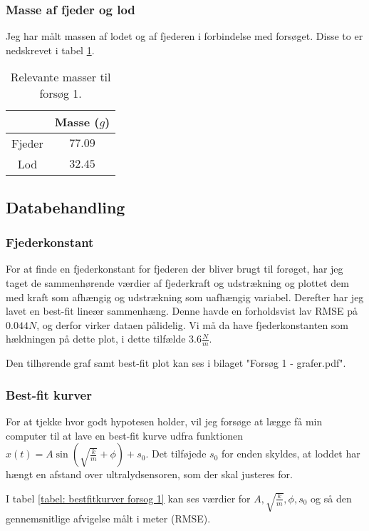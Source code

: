 \subsubsection{Masse af fjeder og lod}\label{exp1: Masse af fjeder og lod}
Jeg har målt massen af lodet og af fjederen i forbindelse med forsøget. 
Disse to er nedskrevet i tabel \ref{tabel: Masser forsog 1}.
\begin{table}[h]
\centering
\begin{tabular}{|c|c|}
\hline 
 & Masse ($g$) \\ 
\hline 
Fjeder & $77.09$ \\ 
\hline 
Lod & $32.45$ \\ 
\hline 
\end{tabular} 
\caption{Relevante masser til forsøg 1.}
\label{tabel: Masser forsog 1}
\end{table}

\subsection{Databehandling}\label{exp1: databehandling afsnit}
\subsubsection{Fjederkonstant}\label{databehandling: tyk fjeder fjederkonstant}
For at finde en fjederkonstant for fjederen der bliver brugt til forøget, har jeg taget de sammenhørende værdier af fjederkraft og udstrækning og plottet dem med kraft som afhængig og udstrækning som uafhængig variabel. 
Derefter har jeg lavet en best-fit lineær sammenhæng. 
Denne havde en forholdsvist lav RMSE på $0.044N$, og derfor virker dataen pålidelig. 
Vi må da have fjederkonstanten som hældningen på dette plot, i dette tilfælde $3.6\frac{N}{m}$.

Den tilhørende graf samt best-fit plot kan ses i bilaget "Forsøg 1 - grafer.pdf". 
 

\subsubsection{Best-fit kurver}\label{exp1: Best-fit kurver}
For at tjekke hvor godt hypotesen holder, vil jeg forsøge at lægge få min computer til at lave en best-fit kurve udfra funktionen $x(t)=A\sin (\sqrt{\frac{k}{m}}+\phi) + s_0$.
Det tilføjede $s_0$ for enden skyldes, at loddet har hængt en afstand over ultralydsensoren, som der skal justeres for. 

I tabel \ref{tabel: bestfitkurver forsog 1} kan ses værdier for $A, \sqrt{\frac{k}{m}}, \phi ,s_0$ og så den gennemsnitlige afvigelse målt i meter (RMSE).


